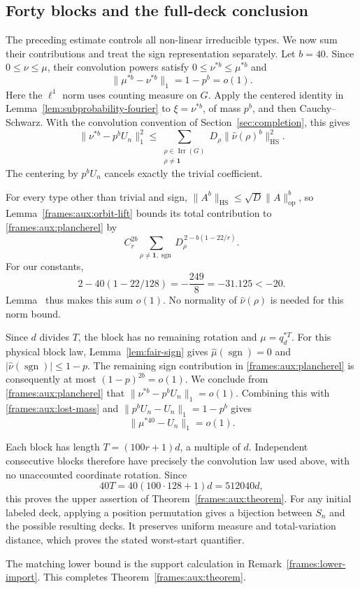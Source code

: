 \subsection{Forty blocks and the full-deck conclusion}

The preceding estimate controls all non-linear irreducible types.
We now sum their contributions and treat the sign representation
separately.  Let $b=40$.  Since $0\le\nu\le\mu$, their convolution
powers satisfy $0\le\nu^{*b}\le\mu^{*b}$ and
\begin{equation}\label{frames:aux:lost-mass}
 \|\mu^{*b}-\nu^{*b}\|_1=1-p^b=o(1).
\end{equation}
Here the $\ell^1$ norm uses counting measure on $G$. Apply the centered
identity in Lemma~\ref{lem:subprobability-fourier} to
$\xi=\nu^{*b}$, of mass $p^b$, and then Cauchy--Schwarz. With the
convolution convention of Section~\ref{sec:completion}, this gives
\begin{equation}\label{frames:aux:plancherel}
 \|\nu^{*b}-p^bU_n\|_1^2
 \le\sum_{\substack{\rho\in\operatorname{Irr}(G)\\
                     \rho\ne\mathbf1}}
       D_\rho\|\widehat\nu(\rho)^b\|_{\mathrm{HS}}^2.
\end{equation}
The centering by $p^bU_n$ cancels exactly the trivial coefficient.

For every type other than trivial and sign,
$\|A^b\|_{\mathrm{HS}}\le\sqrt D\|A\|_{\mathrm{op}}^b$,
so Lemma~\ref{frames:aux:orbit-lift} bounds its total contribution
to \eqref{frames:aux:plancherel} by
\[
 C_r^{2b}
 \sum_{\rho\ne\mathbf1,\operatorname{sgn}}
 D_\rho^{\,2-b(1-22/r)}.
\]
For our constants,
\[
 2-40(1-22/128)=-\frac{249}{8}=-31.125<-20.
\]
Lemma~ thus makes this sum $o(1)$.
No normality of $\widehat\nu(\rho)$ is needed for this norm bound.

Since $d$ divides $T$, the block has no remaining rotation and
$\mu=q_d^{*T}$. For this physical block law,
Lemma~\ref{lem:fair-sign} gives $\widehat\mu(\operatorname{sgn})=0$
and $|\widehat\nu(\operatorname{sgn})|\le1-p$.
The remaining sign contribution in
\eqref{frames:aux:plancherel} is consequently at most
$(1-p)^{2b}=o(1)$.  We conclude from
\eqref{frames:aux:plancherel} that
$\|\nu^{*b}-p^bU_n\|_1=o(1)$.  Combining this with
\eqref{frames:aux:lost-mass} and
$\|p^bU_n-U_n\|_1=1-p^b$ gives
\[
 \|\mu^{*40}-U_n\|_1=o(1).
\]

Each block has length $T=(100r+1)d$, a multiple of $d$.
Independent consecutive blocks therefore have precisely the
convolution law used above, with no unaccounted coordinate rotation.
Since
\[
 40T=40(100\cdot128+1)d=512040d,
\]
this proves the upper assertion of
Theorem~\ref{frames:aux:theorem}.  For any initial labeled deck,
applying a position permutation gives a bijection between $S_n$ and
the possible resulting decks.  It preserves uniform measure and
total-variation distance, which proves the stated worst-start
quantifier.

The matching lower bound is the support calculation in
Remark~\ref{frames:lower-import}. This completes
\mbox{Theorem}~\ref{frames:aux:theorem}.
